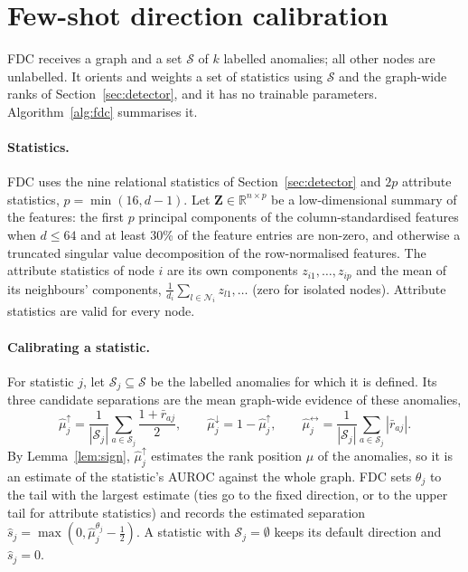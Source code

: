 \documentclass[pdflatex,sn-mathphys-ay]{sn-jnl}
\theoremstyle{plain}
\theoremstyle{remark}
\begin{document}
\section{Few-shot direction calibration}\label{sec:method}

FDC receives a graph and a set $\mathcal{S}$ of $k$ labelled anomalies; all other nodes are unlabelled. It orients and weights a set of statistics using $\mathcal{S}$ and the graph-wide ranks of Section~\ref{sec:detector}, and it has no trainable parameters. Algorithm~\ref{alg:fdc} summarises it.

\paragraph{Statistics.} FDC uses the nine relational statistics of Section~\ref{sec:detector} and $2p$ attribute statistics, $p=\min(16,d-1)$. Let $\mathbf{Z}\in\mathbb{R}^{n\times p}$ be a low-dimensional summary of the features: the first $p$ principal components of the column-standardised features when $d\le64$ and at least 30\% of the feature entries are non-zero, and otherwise a truncated singular value decomposition of the row-normalised features. The attribute statistics of node $i$ are its own components $z_{i1},\dots,z_{ip}$ and the mean of its neighbours' components, $\frac{1}{d_i}\sum_{l\in\mathcal{N}_i}z_{l1},\dots$ (zero for isolated nodes). Attribute statistics are valid for every node.

\paragraph{Calibrating a statistic.} For statistic $j$, let $\mathcal{S}_j\subseteq\mathcal{S}$ be the labelled anomalies for which it is defined. Its three candidate separations are the mean graph-wide evidence of these anomalies,
\begin{equation}\label{eq:sep}
\hat\mu^{\uparrow}_j=\frac{1}{|\mathcal{S}_j|}\sum_{a\in\mathcal{S}_j}\frac{1+\bar r_{aj}}{2},\qquad
\hat\mu^{\downarrow}_j=1-\hat\mu^{\uparrow}_j,\qquad
\hat\mu^{\leftrightarrow}_j=\frac{1}{|\mathcal{S}_j|}\sum_{a\in\mathcal{S}_j}|\bar r_{aj}|.
\end{equation}
By Lemma~\ref{lem:sign}, $\hat\mu^{\uparrow}_j$ estimates the rank position $\mu$ of the anomalies, so it is an estimate of the statistic's AUROC against the whole graph. FDC sets $\theta_j$ to the tail with the largest estimate (ties go to the fixed direction, or to the upper tail for attribute statistics) and records the estimated separation $\hat s_j=\max(0,\hat\mu^{\theta_j}_j-\tfrac12)$. A statistic with $\mathcal{S}_j=\emptyset$ keeps its default direction and $\hat s_j=0$.
\end{document}
